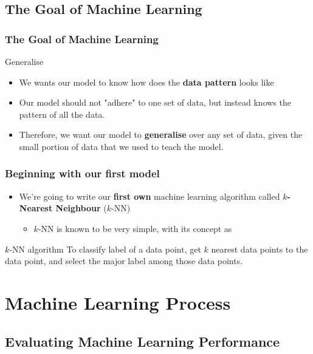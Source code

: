 \documentclass[aspectratio=169]{beamer}
\begin{document}
\subsection{The Goal of Machine Learning}

\begin{frame}
	\frametitle{The Goal of Machine Learning}
	\begin{center}
		 \Huge Generalise
	\end{center}
	\begin{itemize}
		\item<3-> We wants our model to know how does the \textbf{data pattern} looks like
		\item<4-> Our model should not "adhere" to one set of data, but instead knows the pattern of all the data.
		\item<5-> Therefore, we want our model to \textbf{generalise} over any set of data, given the small portion of data that we used to teach the model.
	\end{itemize}
\end{frame}

\begin{frame}
	\frametitle{Beginning with our first model}
	\begin{itemize}
		\item<2-> We're going to write our \textbf{first own} machine learning algorithm called \textbf{$k$-Nearest Neighbour} ($k$-NN)
		      \begin{itemize}
			      \item<3-> $k$-NN is known to be very simple, with its concept as
		      \end{itemize}
	\end{itemize}
	\begin{block}{$k$-NN algorithm}
		To classify label of a data point, get $k$ nearest data points to the data point, and select the major label among those data points.
	\end{block}
\end{frame}

\section{Machine Learning Process}

\subsection{Evaluating Machine Learning Performance}
\end{document}
